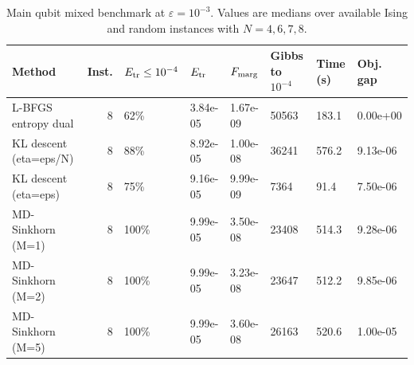 \begin{table}
\caption{Main qubit mixed benchmark at $\varepsilon=10^{-3}$. Values are medians over available Ising and random instances with $N=4,6,7,8$.}
\label{tab:main-qubit-mixed}
\begin{tabular}{lrllllll}
\toprule
Method & Inst. & $E_{\rm tr}\le 10^{-4}$ & $E_{\rm tr}$ & $F_{\rm marg}$ & Gibbs to $10^{-4}$ & Time (s) & Obj. gap \\
\midrule
L-BFGS entropy dual & 8 & 62\% & 3.84e-05 & 1.67e-09 & 50563 & 183.1 & 0.00e+00 \\
KL descent (eta=eps/N) & 8 & 88\% & 8.92e-05 & 1.00e-08 & 36241 & 576.2 & 9.13e-06 \\
KL descent (eta=eps) & 8 & 75\% & 9.16e-05 & 9.99e-09 & 7364 & 91.4 & 7.50e-06 \\
MD-Sinkhorn (M=1) & 8 & 100\% & 9.99e-05 & 3.50e-08 & 23408 & 514.3 & 9.28e-06 \\
MD-Sinkhorn (M=2) & 8 & 100\% & 9.99e-05 & 3.23e-08 & 23647 & 512.2 & 9.85e-06 \\
MD-Sinkhorn (M=5) & 8 & 100\% & 9.99e-05 & 3.60e-08 & 26163 & 520.6 & 1.00e-05 \\
\bottomrule
\end{tabular}
\end{table}
